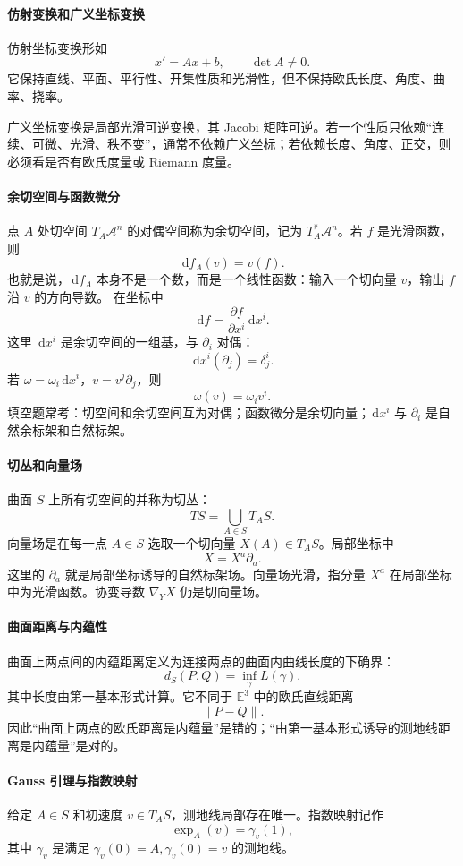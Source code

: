 \documentclass[UTF8,12pt,a4paper]{ctexart}
\newcommand{\E}{\mathbb E}
\newcommand{\A}{\mathcal A}
\newcommand{\dd}{\,\mathrm d}
\newcommand{\norm}[1]{\left\lVert #1\right\rVert}
\begin{document}
\paragraph{仿射变换和广义坐标变换}
仿射坐标变换形如
\[
x'=Ax+b,\qquad \det A\ne0.
\]
它保持直线、平面、平行性、开集性质和光滑性，但不保持欧氏长度、角度、曲率、挠率。

广义坐标变换是局部光滑可逆变换，其 Jacobi 矩阵可逆。若一个性质只依赖“连续、可微、光滑、秩不变”，通常不依赖广义坐标；若依赖长度、角度、正交，则必须看是否有欧氏度量或 Riemann 度量。

\paragraph{余切空间与函数微分}
点 $A$ 处切空间 $T_A\A^n$ 的对偶空间称为余切空间，记为 $T_A^*\A^n$。若 $f$ 是光滑函数，则
\[
\dd f_A(v)=v(f).
\]
也就是说，$\dd f_A$ 本身不是一个数，而是一个线性函数：输入一个切向量 $v$，输出 $f$ 沿 $v$ 的方向导数。
在坐标中
\[
\dd f=\frac{\partial f}{\partial x^i}\dd x^i.
\]
这里 $\dd x^i$ 是余切空间的一组基，与 $\partial_i$ 对偶：
\[
\dd x^i(\partial_j)=\delta^i_j.
\]
若 $\omega=\omega_i\dd x^i$，$v=v^j\partial_j$，则
\[
\omega(v)=\omega_iv^i.
\]
填空题常考：切空间和余切空间互为对偶；函数微分是余切向量；$\dd x^i$ 与 $\partial_i$ 是自然余标架和自然标架。

\paragraph{切丛和向量场}
曲面 $S$ 上所有切空间的并称为切丛：
\[
TS=\bigcup_{A\in S}T_AS.
\]
向量场是在每一点 $A\in S$ 选取一个切向量 $X(A)\in T_AS$。局部坐标中
\[
X=X^a\partial_a.
\]
这里的 $\partial_a$ 就是局部坐标诱导的自然标架场。向量场光滑，指分量 $X^a$ 在局部坐标中为光滑函数。协变导数 $\nabla_YX$ 仍是切向量场。

\paragraph{曲面距离与内蕴性}
曲面上两点间的内蕴距离定义为连接两点的曲面内曲线长度的下确界：
\[
d_S(P,Q)=\inf_\gamma L(\gamma).
\]
其中长度由第一基本形式计算。它不同于 $\E^3$ 中的欧氏直线距离
\[
\norm{P-Q}.
\]
因此“曲面上两点的欧氏距离是内蕴量”是错的；“由第一基本形式诱导的测地线距离是内蕴量”是对的。

\paragraph{Gauss 引理与指数映射}
给定 $A\in S$ 和初速度 $v\in T_AS$，测地线局部存在唯一。指数映射记作
\[
\exp_A(v)=\gamma_v(1),
\]
其中 $\gamma_v$ 是满足 $\gamma_v(0)=A,\dot\gamma_v(0)=v$ 的测地线。
\end{document}
